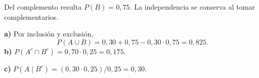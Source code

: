 Del complemento resulta $P(B)=0{,}75$. La independencia se conserva al tomar complementarios.

\textbf{a)} Por inclusión y exclusión,
\[
P(A\cup B)=0{,}30+0{,}75-0{,}30\cdot0{,}75=\boxed{0{,}825}.
\]
\textbf{b)} $P(A^c\cap B^c)=0{,}70\cdot0{,}25=\boxed{0{,}175}$.

\textbf{c)} $P(A\mid B^c)=(0{,}30\cdot0{,}25)/0{,}25=\boxed{0{,}30}$.
